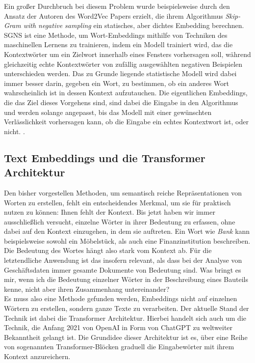 Ein großer Durchbruch bei diesem Problem wurde beispielsweise durch den Ansatz der Autoren des Word2Vec Papers erzielt, die ihrem Algorithmus \emph{Skip-Gram with negative sampling} ein statisches, aber dichtes Embedding berechnen. SGNS ist eine Methode, um Wort-Embeddings mithilfe von Techniken des maschinellen Lernens zu trainieren, indem ein Modell trainiert wird, das die Kontextwörter um ein Zielwort innerhalb eines Fensters vorhersagen soll, während gleichzeitig echte Kontextwörter von zufällig ausgewählten negativen Beispielen unterschieden werden. Das zu Grunde liegende statistische Modell wird dabei immer besser darin, gegeben ein Wort, zu bestimmen, ob ein anderes Wort wahrscheinlich ist in dessen Kontext aufzutauchen. Die eigentlichen Embeddings, die das Ziel dieses Vorgehens sind, sind dabei die Eingabe in den Algorithmus und werden solange angepasst, bis das Modell mit einer gewünschten Verlässlichkeit vorhersagen kann, ob die Eingabe ein echtes Kontextwort ist, oder nicht. \parencite[Vgl. ][]{mikolov_chen_corrado_dean_2013}.


\subsection{Text Embeddings und die Transformer Architektur}
Den bisher vorgestellen Methoden, um semantisch reiche Repräsentationen von Worten zu erstellen, fehlt ein entscheidendes Merkmal, um sie für praktisch nutzen zu können: Ihnen fehlt der Kontext. Bis jetzt haben wir immer ausschließlich versucht, einzelne Wörter in ihrer Bedeutung zu erfassen, ohne dabei auf den Kontext einzugehen, in dem sie auftreten. Ein Wort wie \emph{Bank} kann beispielsweise sowohl ein Möbelstück, als auch eine Finanzinstitution beschreiben. Die Bedeutung des Wortes hängt also stark vom Kontext ab. Für die letztendliche Anwendung ist das insofern relevant, als dass bei der Analyse von Geschäftsdaten immer gesamte Dokumente von Bedeutung sind. Was bringt es mir, wenn ich die Bedeutung einzelner Wörter in der Beschreibung eines Bauteils kenne, nicht aber ihren Zusammenhang untereinander? \\

Es muss also eine Methode gefunden werden, Embeddings nicht auf einzelnen Wörtern zu erstellen, sondern ganze Texte zu verarbeiten. Der aktuelle Stand der Technik ist dabei die Transformer Architektur. Hierbei handelt sich auch um die Technik, die Anfang 2021 von OpenAI in Form von ChatGPT zu weltweiter Bekanntheit gelangt ist. Die Grundidee dieser Architektur ist es, über eine Reihe von sogenannten Transformer-Blöcken graduell die Eingabewörter mit ihrem Kontext anzureichern. \\

